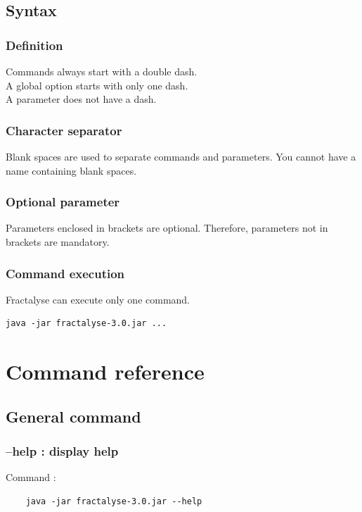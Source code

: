 \documentclass[a4paper,10pt]{report}
\begin{document}
\section{Syntax}
\subsection{Definition}
Commands always start with a double dash.\\
A global option starts with only one dash.\\
A parameter does not have a dash.\\
\subsection{Character separator}
Blank spaces are used to separate commands and parameters. You cannot have a name containing blank spaces.\\

\subsection{Optional parameter}
Parameters enclosed in brackets are optional. 
Therefore, parameters not in brackets are mandatory.


\subsection{Command execution}
Fractalyse can execute only one command.

\begin{Verbatim}
java -jar fractalyse-3.0.jar ...
\end{Verbatim}




\chapter{Command reference}
\section{General command}
\subsection{--help : display help}
Command :

\begin{Verbatim}
	java -jar fractalyse-3.0.jar --help
\end{Verbatim}
\end{document}
